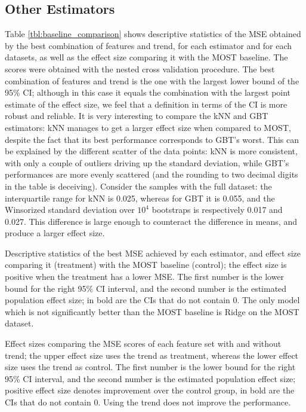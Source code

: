 \documentclass[a4paper]{book}
\begin{document}
\subsection{Other Estimators}
Table \ref{tbl:baseline_comparison} shows descriptive statistics of the MSE obtained by the best combination of features and trend, for each estimator and for each datasets, as well as the effect size comparing it with the MOST baseline. The scores were obtained with the nested cross validation procedure. The best combination of features and trend is the one with the largest lower bound of the 95\% CI; although in this case it equals the combination with the largest point estimate of the effect size, we feel that a definition in terms of the CI is more robust and reliable. It is very interesting to compare the kNN and GBT estimators: kNN manages to get a larger effect size when compared to MOST, despite the fact that its best performance corresponds to GBT's worst. This can be explained by the different scatter of the data points: kNN is more consistent, with only a couple of outliers driving up the standard deviation, while GBT's performances are more evenly scattered (and the rounding to two decimal digits in the table is deceiving). Consider the samples with the full dataset: the interquartile range for kNN is 0.025, whereas for GBT it is 0.055, and the Winsorized standard deviation over $10^4$ bootstraps is respectively 0.017 and 0.027. This difference is large enough to counteract the difference in means, and produce a larger effect size.

\begin{table}[p]
\caption{Descriptive statistics of the best MSE achieved by each estimator, and effect size comparing it (treatment) with the MOST baseline (control); the effect size is positive when the treatment has a lower MSE. The first number is the lower bound for the right 95\% CI interval, and the second number is the estimated population effect size; in bold are the CIs that do not contain 0. The only model which is not significantly better than the MOST baseline is Ridge on the MOST dataset.}
\label{tbl:baseline_comparison}

\end{table}

\begin{table}[p]
\caption{Effect sizes comparing the MSE scores of each feature set with and without trend; the upper effect size uses the trend as treatment, whereas the lower effect size uses the trend as control. The first number is the lower bound for the right 95\% CI interval, and the second number is the estimated population effect size; positive effect size denotes improvement over the control group, in bold are the CIs that do not contain 0. Using the trend does not improve the performance.}
\label{tbl:trend_comparison}

\end{table}
\end{document}
